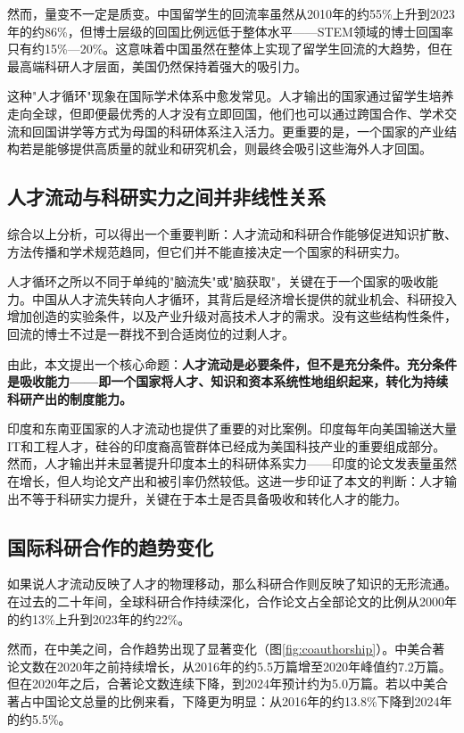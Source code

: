 然而，量变不一定是质变。中国留学生的回流率虽然从2010年的约55\%上升到2023年的约86\%，但博士层级的回国比例远低于整体水平——STEM领域的博士回国率只有约15\%—20\%。这意味着中国虽然在整体上实现了留学生回流的大趋势，但在最高端科研人才层面，美国仍然保持着强大的吸引力。

这种"人才循环"现象在国际学术体系中愈发常见。人才输出的国家通过留学生培养走向全球，但即便最优秀的人才没有立即回国，他们也可以通过跨国合作、学术交流和回国讲学等方式为母国的科研体系注入活力。更重要的是，一个国家的产业结构若是能够提供高质量的就业和研究机会，则最终会吸引这些海外人才回国。

\subsection{人才流动与科研实力之间并非线性关系}

综合以上分析，可以得出一个重要判断：人才流动和科研合作能够促进知识扩散、方法传播和学术规范趋同，但它们并不能直接决定一个国家的科研实力。

人才循环之所以不同于单纯的"脑流失"或"脑获取"，关键在于一个国家的吸收能力。中国从人才流失转向人才循环，其背后是经济增长提供的就业机会、科研投入增加创造的实验条件，以及产业升级对高技术人才的需求。没有这些结构性条件，回流的博士不过是一群找不到合适岗位的过剩人才。

由此，本文提出一个核心命题：\textbf{人才流动是必要条件，但不是充分条件。充分条件是吸收能力——即一个国家将人才、知识和资本系统性地组织起来，转化为持续科研产出的制度能力。}

印度和东南亚国家的人才流动也提供了重要的对比案例。印度每年向美国输送大量IT和工程人才，硅谷的印度裔高管群体已经成为美国科技产业的重要组成部分。然而，人才输出并未显著提升印度本土的科研体系实力——印度的论文发表量虽然在增长，但人均论文产出和被引率仍然较低。这进一步印证了本文的判断：人才输出不等于科研实力提升，关键在于本土是否具备吸收和转化人才的能力。

\subsection{国际科研合作的趋势变化}

如果说人才流动反映了人才的物理移动，那么科研合作则反映了知识的无形流通。在过去的二十年间，全球科研合作持续深化，合作论文占全部论文的比例从2000年的约13\%上升到2023年的约22\%。

然而，在中美之间，合作趋势出现了显著变化（图\ref{fig:coauthorship}）。中美合著论文数在2020年之前持续增长，从2016年的约5.5万篇增至2020年峰值约7.2万篇。但在2020年之后，合著论文数连续下降，到2024年预计约为5.0万篇。若以中美合著占中国论文总量的比例来看，下降更为明显：从2016年的约13.8\%下降到2024年的约5.5\%。

